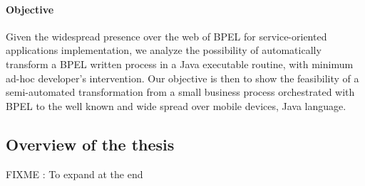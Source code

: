 \paragraph{Objective}
Given the widespread presence over the web of BPEL for service-oriented applications implementation, we analyze the possibility of automatically transform a BPEL written process in a Java executable routine, with minimum ad-hoc developer's intervention.
Our objective is then to show the feasibility of a semi-automated transformation from a small business process orchestrated with BPEL to the well known and wide spread over mobile devices, Java language. 





\subsection{Overview of the thesis}
FIXME : To expand at the end



